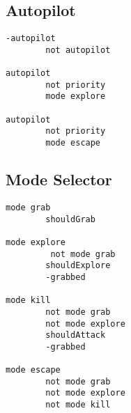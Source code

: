 \hypertarget{autopilot}{%
\subsection{Autopilot}\label{autopilot}}

\begin{verbatim}
-autopilot
        not autopilot

autopilot
        not priority
        mode explore

autopilot
        not priority
        mode escape
\end{verbatim}

\hypertarget{mode-selector}{%
\subsection{Mode Selector}\label{mode-selector}}

\begin{verbatim}
mode grab
        shouldGrab

mode explore
         not mode grab
        shouldExplore
        -grabbed

mode kill
        not mode grab
        not mode explore
        shouldAttack
        -grabbed

mode escape
        not mode grab
        not mode explore
        not mode kill
\end{verbatim}